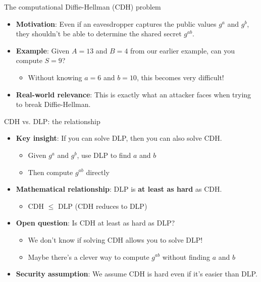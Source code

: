 \documentclass[aspectratio=169, lualatex, handout]{beamer}
\begin{document}
\begin{frame}{The computational Diffie-Hellman (CDH) problem}
	\begin{itemize}[<+->]
		\item \textbf{Motivation}: Even if an eavesdropper captures the public values $g^a$ and $g^b$, they shouldn't be able to determine the shared secret $g^{ab}$.
		\item \textbf{Example}: Given $A = 13$ and $B = 4$ from our earlier example, can you compute $S = 9$?
		      \begin{itemize}
			      \item Without knowing $a = 6$ and $b = 10$, this becomes very difficult!
		      \end{itemize}
		\item \textbf{Real-world relevance}: This is exactly what an attacker faces when trying to break Diffie-Hellman.
	\end{itemize}
\end{frame}

\begin{frame}{CDH vs. DLP: the relationship}
	\begin{itemize}[<+->]
		\item \textbf{Key insight}: If you can solve DLP, then you can also solve CDH.
		      \begin{itemize}
			      \item Given $g^a$ and $g^b$, use DLP to find $a$ and $b$
			      \item Then compute $g^{ab}$ directly
		      \end{itemize}
		\item \textbf{Mathematical relationship}: DLP is \textbf{at least as hard} as CDH.
		      \begin{itemize}
			      \item CDH $\leq$ DLP (CDH reduces to DLP)
		      \end{itemize}
		\item \textbf{Open question}: Is CDH at least as hard as DLP?
		      \begin{itemize}
			      \item We don't know if solving CDH allows you to solve DLP!
			      \item Maybe there's a clever way to compute $g^{ab}$ without finding $a$ and $b$
		      \end{itemize}
		\item \textbf{Security assumption}: We assume CDH is hard even if it's easier than DLP.
	\end{itemize}
\end{frame}
\end{document}
